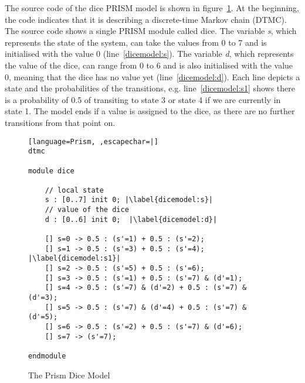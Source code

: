 \documentclass[
a4paper,
12pt
]{scrartcl}
\begin{document}
The source code of the dice PRISM model is shown in figure~\ref{fig:dicemodel}. At the beginning, the code indicates that it is describing a discrete-time Markov chain (DTMC). The source code shows a single PRISM module called dice. The variable \textit{s}, which represents the state of the system, can take the values from 0 to 7 and is initialised with the value 0 (line~\ref{dicemodel:s}). The variable \textit{d}, which represents the value of the dice, can range from 0 to 6 and is also initialised with the value 0, meaning that the dice has no value yet (line~\ref{dicemodel:d}).
Each line depicts a state and the probabilities of the transitions, e.g. line~\ref{dicemodel:s1} shows there is a probability of 0.5 of transiting to state 3 or state 4 if we are currently in state 1. The model ends if a value is assigned to the dice, as there are no further transitions from that point on.

\begin{figure}[ht!]
\begin{lstlisting}[language=Prism, ,escapechar=|]
dtmc

module dice

	// local state
	s : [0..7] init 0; |\label{dicemodel:s}|
	// value of the dice
	d : [0..6] init 0;  |\label{dicemodel:d}|
	
	[] s=0 -> 0.5 : (s'=1) + 0.5 : (s'=2);
	[] s=1 -> 0.5 : (s'=3) + 0.5 : (s'=4); |\label{dicemodel:s1}|
	[] s=2 -> 0.5 : (s'=5) + 0.5 : (s'=6);
	[] s=3 -> 0.5 : (s'=1) + 0.5 : (s'=7) & (d'=1);
	[] s=4 -> 0.5 : (s'=7) & (d'=2) + 0.5 : (s'=7) & (d'=3);
	[] s=5 -> 0.5 : (s'=7) & (d'=4) + 0.5 : (s'=7) & (d'=5);
	[] s=6 -> 0.5 : (s'=2) + 0.5 : (s'=7) & (d'=6);
	[] s=7 -> (s'=7);
	
endmodule

\end{lstlisting}
\caption{The Prism Dice Model}
\label{fig:dicemodel}
\end{figure}
\end{document}

